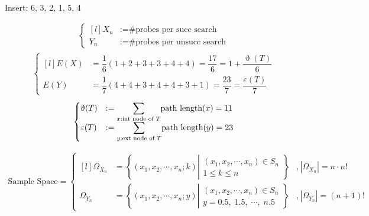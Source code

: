 \documentclass[11pt,fleqn]{article}
\begin{document}
\raggedright

\paragraph{} Insert: 6, 3, 2, 1, 5, 4

\begin{align*}
	\left\{\begin{matrix*}[l]
		X_n &:= \text{\# probes per succ search} \\
		Y_n &:= \text{\# probes per unsucc search}
	\end{matrix*}\right.
\end{align*}
\begin{align*}
	\left\{\begin{matrix*}[l]
		E(X) &= \dfrac{1}{6} \left(1+2+3+3+4+4\right) = \dfrac{17}{6} = 1 + \dfrac{\upvartheta(T)}{6} \\
		E(Y) &= \dfrac{1}{7} \left(4+4+3+4+4+3+1\right) = \dfrac{23}{7} = \dfrac{\varepsilon(T)}{7}
	\end{matrix*}\right.
\end{align*}
\begin{align*}
	\left\{\begin{matrix*}[l]
		\upvartheta(T) &:= \mathlarger{\sum}\limits_{x : \text{int node of } T} \text{path length}(x) = 11\\
		\varepsilon(T) &:= \mathlarger{\sum}\limits_{y : \text{ext node of } T} \text{path length}(y) = 23
	\end{matrix*}\right.
\end{align*}

\begin{align*}
	\text{Sample Space} = \left\{\begin{matrix*}[l]
		\Omega_{X_n} &= \left\{(x_1, x_2, \cdots, x_n; k) 
			\left|\begin{matrix}
				(x_1, x_2, \cdots, x_n) \in S_n \\ 
				1 \le k \le n
			\end{matrix}\right. 
		\right\} &, |\Omega_{X_n}| = n \cdot n! \\
		\Omega_{Y_n} &= \left\{(x_1, x_2, \cdots, x_n; y)
	   		\left|\begin{matrix}	
				(x_1, x_2, \cdots, x_n) \in S_n \\
				y = 0.5, \; 1.5, \; \cdots, \; n.5
			\end{matrix}\right.
		\right\} &, |\Omega_{Y_n}| = (n+1)!
	\end{matrix*}\right. 
\end{align*}
\end{document}

